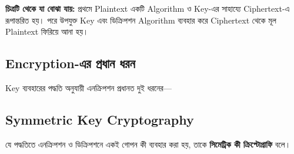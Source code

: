 \noindent
\textbf{চিত্রটি থেকে যা বোঝা যায়:}
প্রথমে Plaintext একটি Algorithm ও Key-এর সাহায্যে Ciphertext-এ
রূপান্তরিত হয়। পরে উপযুক্ত Key এবং ডিক্রিপশন Algorithm ব্যবহার
করে Ciphertext থেকে মূল Plaintext ফিরিয়ে আনা হয়।



\subsection{Encryption-এর প্রধান ধরন}

Key ব্যবহারের পদ্ধতি অনুযায়ী এনক্রিপশন প্রধানত দুই ধরনের---

\begin{flushleft}\centering\captionsetup{justification=centering}
\begin{minipage}{0.88\linewidth}
\raggedright
\small



\end{minipage}
\end{flushleft}



\subsection{Symmetric Key Cryptography}

\begin{definitionbox}{}

যে পদ্ধতিতে এনক্রিপশন ও ডিক্রিপশনে একই গোপন কী ব্যবহার করা হয়, তাকে \textbf{সিমেট্রিক কী ক্রিপ্টোগ্রাফি} বলে।

\end{definitionbox}


